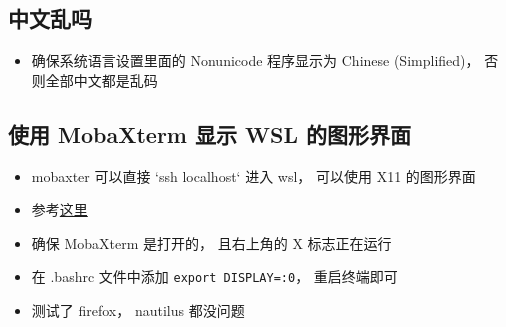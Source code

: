 \subsection{中文乱吗}
\begin{itemize}
\item 确保系统语言设置里面的 Nonunicode 程序显示为 Chinese (Simplified)， 否则全部中文都是乱码
\end{itemize}

\subsection{使用 MobaXterm 显示 WSL 的图形界面}
\begin{itemize}
\item mobaxter 可以直接 `ssh localhost` 进入 wsl， 可以使用 X11 的图形界面
\item 参考\href{https://nickjanetakis.com/blog/using-wsl-and-mobaxterm-to-create-a-linux-dev-environment-on-windows}{这里}
\item 确保 MobaXterm 是打开的， 且右上角的 X 标志正在运行
\item 在 .bashrc 文件中添加 \verb`export DISPLAY=:0`， 重启终端即可
\item 测试了 firefox， nautilus 都没问题
\end{itemize}
